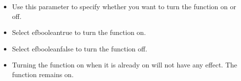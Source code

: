 % 
\begin{itemize}
\item Use this parameter to specify whether you want to turn the function on or off.
\item Select \jb{}efbooleantrue{} to turn the function on.
\item Select \jb{}efbooleanfalse{} to turn the function off.
\item Turning the function on when it is already on will not have any effect. The function remains on.
\end{itemize}

